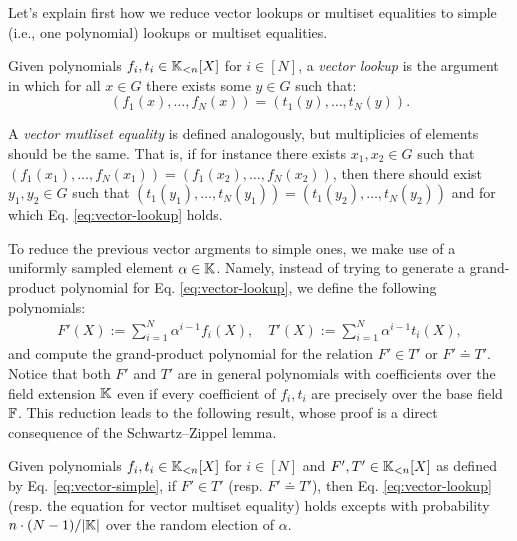 Let's explain first how we reduce vector lookups or multiset equalities to simple (i.e., one polynomial) lookups or multiset equalities.
\begin{definition}\label{def:vec-args}
  Given polynomials $f_i,t_i \in \mathbb{K}_{<n}[X]$ for $i\in[N]$, a \textit{vector lookup} is the argument in which for all $x \in G$ there exists some $y \in G$ such that:
  \begin{equation}\label{eq:vector-lookup}
    (f_1(x),\dots,f_N(x)) = (t_1(y),\dots,t_N(y)).
  \end{equation}

  A \textit{vector mutliset equality} is defined analogously, but multiplicies of elements should be the same. That is, if for instance there exists $x_1,x_2 \in G$ such that $(f_1(x_1),\dots,f_N(x_1)) = (f_1(x_2),\dots,f_N(x_2))$, then there should exist $y_1,y_2 \in G$ such that $(t_1(y_1),\dots,t_N(y_1)) = (t_1(y_2),\dots,t_N(y_2))$ and for which Eq. \eqref{eq:vector-lookup} holds.
\end{definition}

To reduce the previous vector argments to simple ones, we make use of a uniformly sampled element $\alpha \in \mathbb{K}$. Namely, instead of trying to generate a grand-product polynomial for Eq. \eqref{eq:vector-lookup}, we define the following polynomials:
\begin{align}\label{eq:vector-simple}
  F'(X) := \sum_{i=1}^N \alpha^{i-1}f_i(X), \quad T'(X) := \sum_{i=1}^N \alpha^{i-1}t_i(X),
\end{align}
and compute the grand-product polynomial for the relation $F' \in T'$ or $F' \doteq T'$. Notice that both $F'$ and $T'$ are in general polynomials with coefficients over the field extension $\mathbb{K}$ even if every coefficient of $f_i,t_i$ are precisely over the base field $\mathbb{F}$. This reduction leads to the following result, whose proof is a direct consequence of the Schwartz–Zippel lemma.

\begin{lemma}\label{col:vector-to-simple}
  Given polynomials $f_i,t_i \in \mathbb{K}_{<n}[X]$ for $i\in[N]$ and $F',T' \in \mathbb{K}_{<n}[X]$ as defined by Eq. \eqref{eq:vector-simple}, if $F' \in T'$ (resp. $F' \doteq T'$), then Eq. \eqref{eq:vector-lookup} (resp. the equation for vector multiset equality) holds excepts with probability $n \cdot (N-1)/|\mathbb{K}|$ over the random election of $\alpha$.
\end{lemma}

